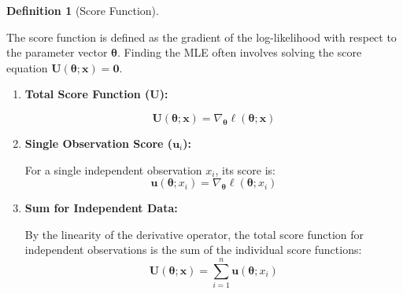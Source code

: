 \documentclass[
  letterpaper,
  DIV=11,
  numbers=noendperiod]{scrreprt}
\renewcommand{\[}{\begin{equation}}
\renewcommand{\]}{\end{equation}}
\theoremstyle{definition}
\newtheorem{definition}{Definition}[chapter]
\theoremstyle{plain}
\theoremstyle{plain}
\theoremstyle{plain}
\theoremstyle{definition}
\theoremstyle{plain}
\theoremstyle{remark}
\begin{document}
\begin{definition}[Score
Function]\protect\hypertarget{def-score}{}\label{def-score}

The score function is defined as the gradient of the log-likelihood with
respect to the parameter vector \(\boldsymbol{\theta}\). Finding the MLE
often involves solving the score equation
\(\mathbf{U}(\boldsymbol{\theta}; \mathbf{x}) = \mathbf{0}\).

\begin{enumerate}
\def\labelenumi{\arabic{enumi}.}
\item
  \textbf{Total Score Function (\(\mathbf{U}\)):}

  \[
  \mathbf{U}(\boldsymbol{\theta}; \mathbf{x}) = \nabla_{\boldsymbol{\theta}} \ell(\boldsymbol{\theta}; \mathbf{x})
  \]
\item
  \textbf{Single Observation Score (\(\mathbf{u}_i\)):}

  For a single independent observation \(x_i\), its score is: \[
  \mathbf{u}(\boldsymbol{\theta}; x_i) = \nabla_{\boldsymbol{\theta}} \ell(\boldsymbol{\theta}; x_i)
  \]
\item
  \textbf{Sum for Independent Data:}

  By the linearity of the derivative operator, the total score function
  for independent observations is the sum of the individual score
  functions: \[
  \mathbf{U}(\boldsymbol{\theta}; \mathbf{x}) = \sum_{i=1}^n \mathbf{u}(\boldsymbol{\theta}; x_i)
  \]
\end{enumerate}

\end{definition}
\end{document}
